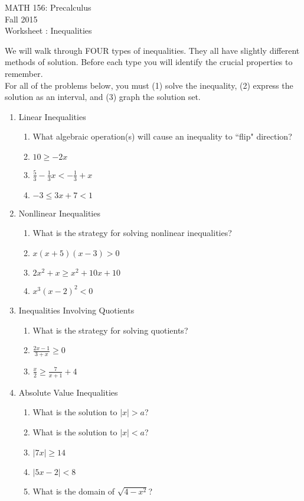 \documentclass[11pt]{article}
\newcommand{\sect}{\textsection}
\begin{document}
 

\begin{center}MATH 156: Precalculus  \\ Fall 2015 \\ Worksheet \sect 1.8: Inequalities\end{center}

\hrulefill

We will walk through  FOUR types of inequalities. They all have slightly different methods of solution. Before each type you will identify the crucial properties to remember.\\
For all of the problems below, you must (1) solve the inequality, (2) express the solution as an interval, and (3) graph the solution set.
\begin{enumerate}
\item Linear Inequalities
\begin{enumerate}
\item  What algebraic operation(s) will cause an inequality to ``flip" direction?
\vfill
\item $10 \geq-2x$
\vfill
\item $\frac{5}{3}-\frac{1}{3}x < -\frac{1}{3} + x$
\vfill
\item $-3 \leq 3x+7 < 1$
\vfill
\end{enumerate}
\newpage
\item Nonllinear Inequalities
\begin{enumerate}
\item What is the strategy for solving nonlinear inequalities?
\vfill
\item $x(x+5)(x-3)>0$
\vfill
\item $2x^2+x\geq x^2+10x+10$
\vfill
\item $x^3(x-2)^2<0$
\vfill
\end{enumerate}
\newpage
\item Inequalities Involving Quotients
\begin{enumerate}
\item What is the strategy for solving quotients?
\vfill
\item $\frac{2x-1}{3+x}\geq0$
\vfill
\item $\frac{x}{2}\geq\frac{7}{x+1}+4$
\vfill
\end{enumerate}
\item Absolute Value Inequalities
\begin{enumerate}
\item What is the solution to $|x| > a$?
\vfill
\item What is the solution to $|x| < a$?
\vfill
\newpage
\item $|7x| \geq 14$
\vfill
\item $|5x-2|<8$
\vfill
\item What is the domain of $\sqrt{4-x^2}$?
\vfill
\end{enumerate}

 \end{enumerate}
\end{document}
